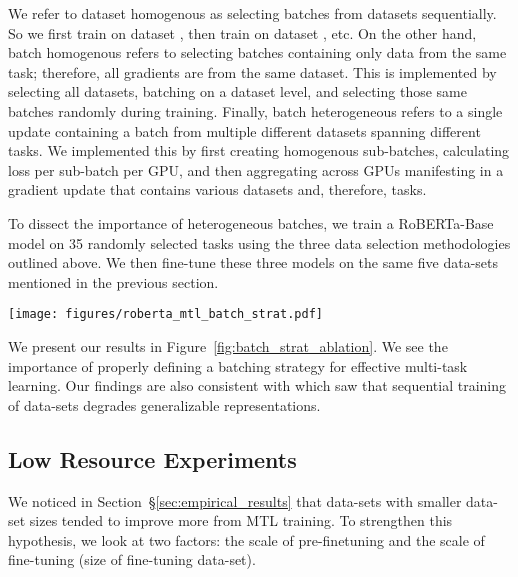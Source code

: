 \documentclass[11pt,a4paper]{article}
\begin{document}
We refer to dataset homogenous as selecting batches from datasets sequentially. So we first train on dataset , then train on dataset , etc. On the other hand, batch homogenous refers to selecting batches containing only data from the same task; therefore, all gradients are from the same dataset. This is implemented by selecting all datasets, batching on a dataset level, and selecting those same batches randomly during training. Finally, batch heterogeneous refers to a single update containing a batch from multiple different datasets spanning different tasks. We implemented this by first creating homogenous sub-batches, calculating loss per sub-batch per GPU, and then aggregating across GPUs manifesting in a gradient update that contains various datasets and, therefore, tasks. 


To dissect the importance of heterogeneous batches, we train a RoBERTa-Base model on 35 randomly selected tasks using the three data selection methodologies outlined above. We then fine-tune these three models on the same five data-sets mentioned in the previous section.

\begin{figure*}
    \centering
    \texttt{[image: figures/roberta\_mtl\_batch\_strat.pdf]}
    \caption{We plot the evaluation accuracy of RoBERTa across five datasets: RTE, BoolQ, RACE, SQuAD, and MNLI, using our three batching strategies for multi-task: Dataset Homogeneous, Batch Homogeneous, Batch Heterogeneous. The use of heterogenous batches outperforms other batching strategies by a significant margin and highlights the importance of implementing MTL with the correct batching strategy.}
    \label{fig:batch_strat_ablation}
\end{figure*}

We present our results in Figure~\ref{fig:batch_strat_ablation}. We see the importance of properly defining a batching strategy for effective multi-task learning. Our findings are also consistent with \cite{RXF} which saw that sequential training of data-sets degrades generalizable representations.

\subsection{Low Resource Experiments}
We noticed in Section~\S\ref{sec:empirical_results} that data-sets with smaller data-set sizes tended to improve more from MTL training. To strengthen this hypothesis, we look at two factors: the scale of pre-finetuning and the scale of fine-tuning (size of fine-tuning data-set).
\end{document}
